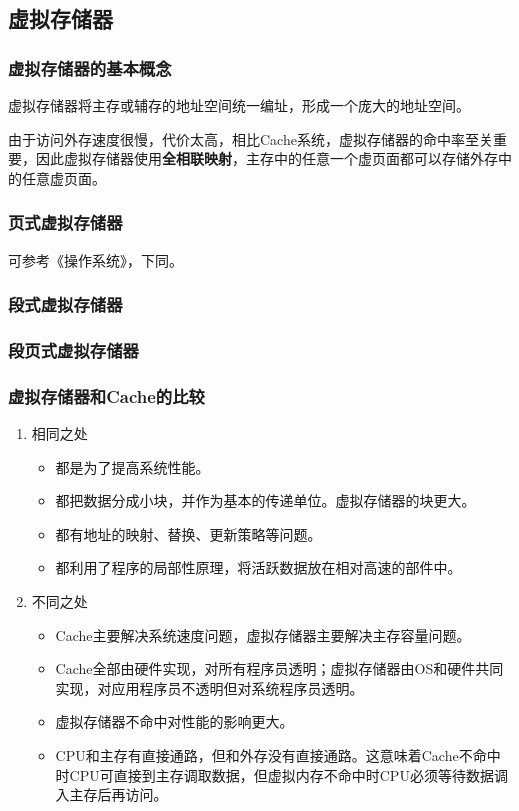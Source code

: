 \documentclass[12pt, a4paper, oneside]{ctexart}
\begin{document}
\subsection{虚拟存储器}

\subsubsection{虚拟存储器的基本概念}

虚拟存储器将主存或辅存的地址空间统一编址，形成一个庞大的地址空间。

由于访问外存速度很慢，代价太高，相比Cache系统，虚拟存储器的命中率至关重要，因此虚拟存储器使用\textbf{全相联映射}，主存中的任意一个虚页面都可以存储外存中的任意虚页面。

\subsubsection{页式虚拟存储器}

可参考《操作系统》，下同。

\subsubsection{段式虚拟存储器}

\subsubsection{段页式虚拟存储器}

\subsubsection{虚拟存储器和Cache的比较}

\begin{enumerate}
  \item {\kaishu 相同之处}
  
  \begin{itemize}
    \item 都是为了提高系统性能。
    \item 都把数据分成小块，并作为基本的传递单位。虚拟存储器的块更大。
    \item 都有地址的映射、替换、更新策略等问题。
    \item 都利用了程序的局部性原理，将活跃数据放在相对高速的部件中。
  \end{itemize}
  \item {\kaishu 不同之处}
  
  \begin{itemize}
    \item Cache主要解决系统速度问题，虚拟存储器主要解决主存容量问题。
    \item Cache全部由硬件实现，对所有程序员透明；虚拟存储器由OS和硬件共同实现，对应用程序员不透明但对系统程序员透明。
    \item 虚拟存储器不命中对性能的影响更大。
    \item CPU和主存有直接通路，但和外存没有直接通路。这意味着Cache不命中时CPU可直接到主存调取数据，但虚拟内存不命中时CPU必须等待数据调入主存后再访问。
  \end{itemize}
\end{enumerate}
\end{document}
